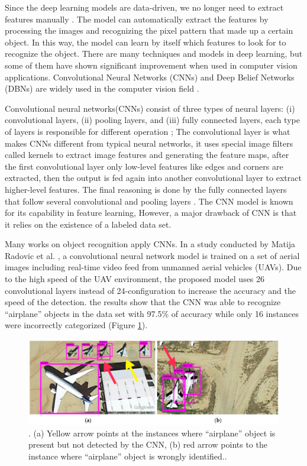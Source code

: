 \documentclass[12pt,twocolumn,a4paper]{article}
\begin{document}
    Since the deep learning models are data-driven, we no longer need to extract features manually \cite{Mutihac2005PARADIGMSIO}. The model can automatically extract the features by processing the images and recognizing the pixel pattern that made up a certain object. In this way, the model can learn by itself which features to look for to recognize the object. There are many techniques and models in deep learning, but some of them have shown significant improvement when used in computer vision applications. Convolutional Neural Networks (CNNs) and Deep Belief Networks (DBNs) are widely used in the computer vision field \cite{Voulodimos2018-cu}.

    Convolutional neural networks(CNNs) consist of three types of neural layers: (i) convolutional layers, (ii) pooling layers, and (iii) fully connected layers, each type of layers is responsible for different operation \cite{Voulodimos2018-cu}; The convolutional layer is what makes CNNs different from typical neural networks, it uses special image filters called kernels to extract image features and generating the feature maps, after the first convolutional layer only low-level features like edges and corners are extracted, then the output is fed again into another convolutional layer to extract higher-level features. The final reasoning is done by the fully connected layers that follow several convolutional and pooling layers \cite{Voulodimos2018-cu}. The CNN model is known for its capability in feature learning, However, a major drawback of CNN is that it relies on the existence of a labeled data set.

    Many works on object recognition apply CNNs. In a study conducted by Matija Radovic et al. \cite{Radovic2017-la}, a convolutional neural network model is trained on a set of aerial images including real-time video feed from unmanned aerial vehicles (UAVs). Due to the high speed of the UAV environment, the proposed model uses 26 convolutional layers instead of 24-configuration to increase the accuracy and the speed of the detection. the results show that the CNN was able to recognize “airplane” objects in the data set with 97.5\% of accuracy  while only 16 instances were incorrectly categorized (Figure \ref{fig:aa}).
    
    \begin{figure}[htp]
        \centering
        \includegraphics[scale=0.5]{jimaging-03-00021-g004.png}
        \caption{\centering . (a) Yellow arrow points at the instances where “airplane” object is present but not detected by the CNN, (b) red arrow points to the instance where “airplane” object is wrongly identified.\cite{Radovic2017-la}.}
        \label{fig:aa}
    \end{figure}
\end{document}
